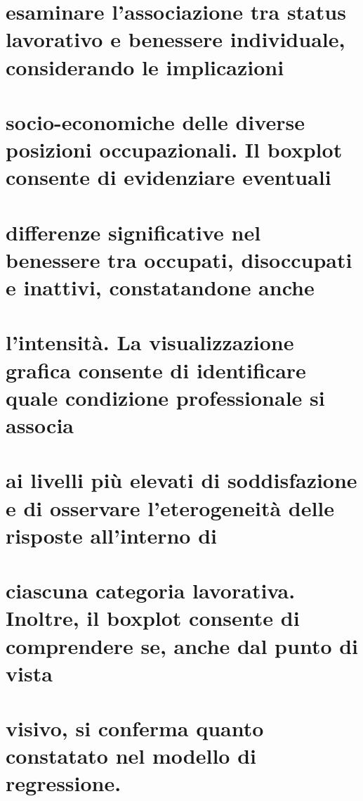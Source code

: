 \documentclass[
]{article}
\begin{document}
\section{esaminare l'associazione tra status lavorativo e benessere
individuale, considerando le
implicazioni}\label{esaminare-lassociazione-tra-status-lavorativo-e-benessere-individuale-considerando-le-implicazioni}

\section{socio-economiche delle diverse posizioni occupazionali. Il
boxplot consente di evidenziare
eventuali}\label{socio-economiche-delle-diverse-posizioni-occupazionali.-il-boxplot-consente-di-evidenziare-eventuali}

\section{differenze significative nel benessere tra occupati,
disoccupati e inattivi, constatandone
anche}\label{differenze-significative-nel-benessere-tra-occupati-disoccupati-e-inattivi-constatandone-anche}

\section{l'intensità. La visualizzazione grafica consente di
identificare quale condizione professionale si
associa}\label{lintensituxe0.-la-visualizzazione-grafica-consente-di-identificare-quale-condizione-professionale-si-associa}

\section{ai livelli più elevati di soddisfazione e di osservare
l'eterogeneità delle risposte all'interno
di}\label{ai-livelli-piuxf9-elevati-di-soddisfazione-e-di-osservare-leterogeneituxe0-delle-risposte-allinterno-di}

\section{ciascuna categoria lavorativa. Inoltre, il boxplot consente di
comprendere se, anche dal punto di
vista}\label{ciascuna-categoria-lavorativa.-inoltre-il-boxplot-consente-di-comprendere-se-anche-dal-punto-di-vista}

\section{visivo, si conferma quanto constatato nel modello di
regressione.}\label{visivo-si-conferma-quanto-constatato-nel-modello-di-regressione.}
\end{document}
